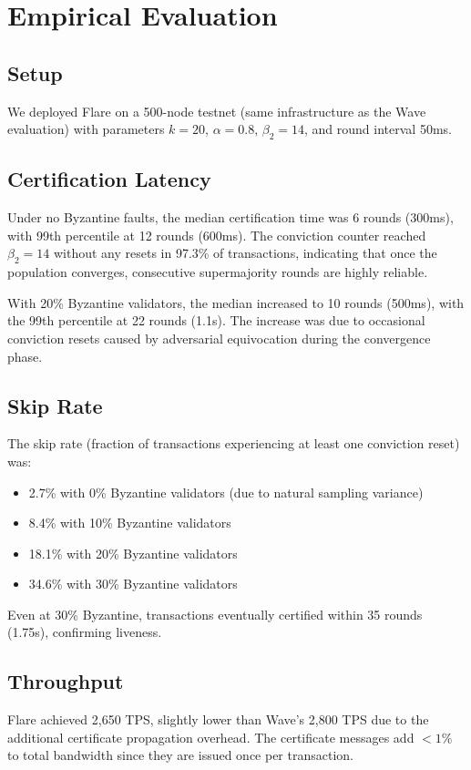 \section{Empirical Evaluation}

\label{sec:evaluation}

\subsection{Setup}

We deployed Flare on a 500-node testnet (same infrastructure as the Wave evaluation)
with parameters $k = 20$, $\alpha = 0.8$, $\beta_2 = 14$, and round interval 50ms.

\subsection{Certification Latency}

Under no Byzantine faults, the median certification time was 6 rounds (300ms), with
99th percentile at 12 rounds (600ms). The conviction counter reached $\beta_2 = 14$
without any resets in 97.3\% of transactions, indicating that once the population
converges, consecutive supermajority rounds are highly reliable.

With 20\% Byzantine validators, the median increased to 10 rounds (500ms), with the
99th percentile at 22 rounds (1.1s). The increase was due to occasional conviction
resets caused by adversarial equivocation during the convergence phase.

\subsection{Skip Rate}

The skip rate (fraction of transactions experiencing at least one conviction reset)
was:
\begin{itemize}[nosep]
\item 2.7\% with 0\% Byzantine validators (due to natural sampling variance)
\item 8.4\% with 10\% Byzantine validators
\item 18.1\% with 20\% Byzantine validators
\item 34.6\% with 30\% Byzantine validators
\end{itemize}

Even at 30\% Byzantine, transactions eventually certified within 35 rounds (1.75s),
confirming liveness.

\subsection{Throughput}

Flare achieved 2,650 TPS, slightly lower than Wave's 2,800 TPS due to the additional
certificate propagation overhead. The certificate messages add $< 1\%$ to total
bandwidth since they are issued once per transaction.

